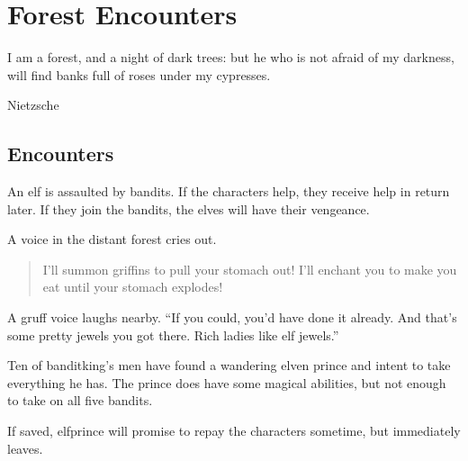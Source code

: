 \chapter{Forest Encounters}

\epigraph{I am a forest, and a night of dark trees: but he who is not afraid of my darkness, will find banks full of roses under my cypresses.}{Nietzsche}

\renewcommand{\sqarea}{Forest}

\sqtoc

\setcounter{enc}{0}

\section{Encounters}

\begin{multicols}{2}

\label{littleprince}

\sqminitoc

An elf is assaulted by bandits.
If the characters help, they receive help in return later.
If they join the bandits, the elves will have their vengeance.


\begin{boxtext}
	A voice in the distant forest cries out.
	\begin{quote}
		I'll summon griffins to pull your stomach out!  I'll enchant you to make you eat until your stomach explodes!
	\end{quote}

	A gruff voice laughs nearby.  ``If you could, you'd have done it already.  And that's some pretty jewels you got there.  Rich ladies like elf jewels.''

\end{boxtext}

Ten of \gls{banditking}'s men have found a wandering elven prince and intent to take everything he has.
The prince does have some magical abilities, but not enough to take on all five bandits.


\elfprince

If saved, \gls{elfprince} will promise to repay the characters sometime, but immediately leaves.



\end{multicols}
